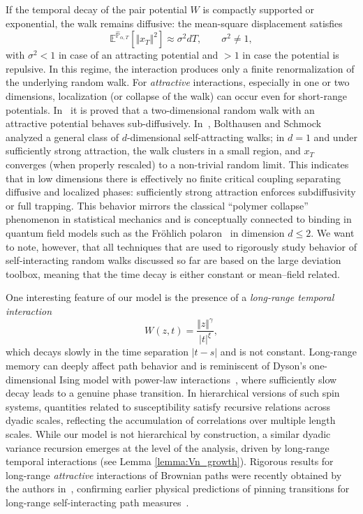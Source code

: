\documentclass[reqno,11pt]{amsart}
\newcommand{\1}{\mathds{1}}
\theoremstyle{plain}
\theoremstyle{definition}
\numberwithin{equation}{section}
\newcommand{\bbE}{{\mathbb E}}
\newcommand{\bbP}{{\mathbb P}}
\newcommand{\bbPh}{\hat{\bbP}}
\begin{document}
If the temporal decay of the pair potential $W$ is compactly supported or exponential, the walk remains diffusive: the mean-square displacement satisfies
\[
    \bbE^{\bbPh_{\alpha,T}}[\Vert x_T \Vert^2] \approx \sigma^2 d T,
    \qquad \sigma^2 \neq 1,
\]
with $\sigma^2<1$ in case of an attracting potential and $>1$ in case the potential is repulsive. In this regime, the interaction produces only a finite renormalization of the underlying random walk.
For \emph{attractive} interactions, especially in one or two dimensions, localization (or collapse of the walk) can occur even for short-range potentials. In~\cite{Bolthausen1994} it is proved that a two-dimensional random walk with an attractive potential behaves sub-diffusively. In~\cite{Bolthausen1997}, Bolthausen and Schmock analyzed a general class of $d$-dimensional self-attracting walks; in $d=1$ and under sufficiently strong attraction, the walk clusters in a small region, and $x_T$ converges (when properly rescaled) to a non-trivial random limit. This indicates that in low dimensions there is effectively no finite critical coupling separating diffusive and localized phases: sufficiently strong attraction enforces subdiffusivity or full trapping. This behavior mirrors the classical ``polymer collapse'' phenomenon in statistical mechanics and is conceptually connected to binding in quantum field models such as the Fröhlich polaron~\cite{Spohn1986} in dimension $d \le 2$. We want to note, however, that all techniques that are used to rigorously study behavior of self-interacting random walks discussed so far are based on the large deviation toolbox, meaning that the time decay is either constant or mean--field related.

One interesting feature of our model is the presence of a \emph{long-range temporal interaction}
\[
   W(z,t) = \frac{\Vert z \Vert^\gamma}{|t|^\xi},
\]
which decays slowly in the time separation $|t-s|$ and is not constant. Long-range memory can deeply affect path behavior and is reminiscent of Dyson’s one-dimensional Ising model with power-law interactions~\cite{Dyson1969,Baker1972}, where sufficiently slow decay leads to a genuine phase transition. In hierarchical versions of such spin systems, quantities related to susceptibility satisfy recursive relations across dyadic scales, reflecting the accumulation of correlations over multiple length scales. While our model is not hierarchical by construction, a similar dyadic variance recursion emerges at the level of the analysis, driven by long-range temporal interactions (see Lemma \ref{lemma:Vn_growth}). Rigorous results for long-range \emph{attractive} interactions of Brownian paths were recently obtained by the authors in~\cite{BeSchSe25b}, confirming earlier physical predictions of pinning transitions for long-range self-interacting path measures~\cite{Spohn1986}.
\end{document}
